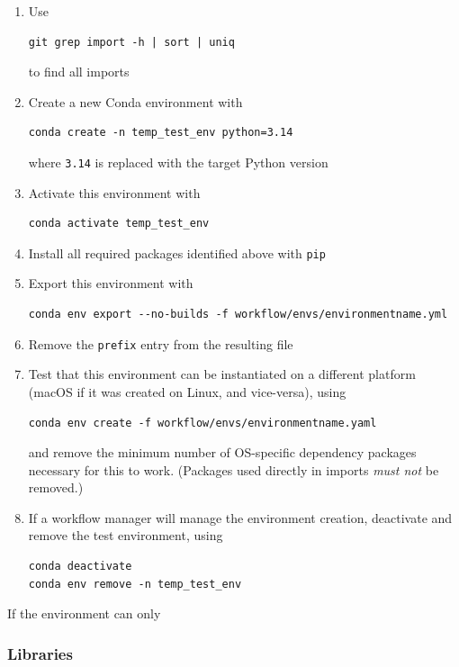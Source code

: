 \documentclass{article}
\newcommand\rfcword[1]{\emph{#1}\xspace}
\newcommand\mustnot{\rfcword{must not}}
\begin{document}
\begin{enumerate}
  \item
        Use
\begin{verbatim}
git grep import -h | sort | uniq
\end{verbatim}
        to find all imports
  \item
        Create a new Conda environment with
\begin{verbatim}
conda create -n temp_test_env python=3.14
\end{verbatim}
        where \verb|3.14| is replaced with the target Python version
  \item
        Activate this environment with
\begin{verbatim}
conda activate temp_test_env
\end{verbatim}
  \item
        Install all required packages identified above with \verb|pip|
  \item
        Export this environment with
\begin{verbatim}
conda env export --no-builds -f workflow/envs/environmentname.yml
\end{verbatim}
  \item
        Remove the \verb|prefix| entry from the resulting file
  \item
        Test that this environment can be instantiated on a different platform
        (macOS if it was created on Linux, and vice-versa),
        using
\begin{verbatim}
conda env create -f workflow/envs/environmentname.yaml
\end{verbatim}
        and remove the minimum number of OS-specific dependency packages
        necessary for this to work.
        (Packages used directly in imports \mustnot be removed.)
  \item
        If a workflow manager will manage the environment creation,
        deactivate and remove the test environment,
        using
\begin{verbatim}
conda deactivate
conda env remove -n temp_test_env
\end{verbatim}
\end{enumerate}

If the environment can only

\subsubsection{Libraries}
\end{document}
